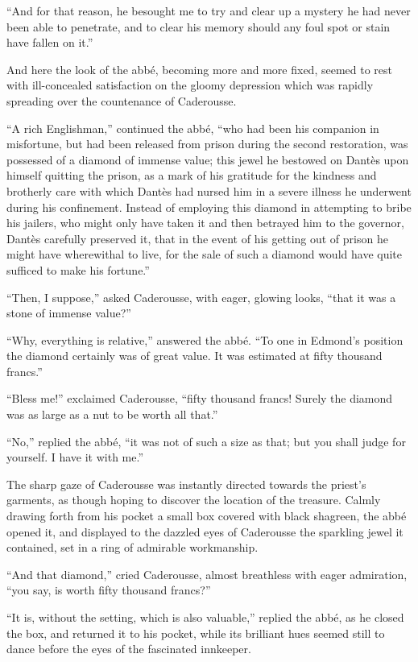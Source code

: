 “And for that reason, he besought me to try and clear up a mystery he
had never been able to penetrate, and to clear his memory should any
foul spot or stain have fallen on it.”

And here the look of the abbé, becoming more and more fixed, seemed to
rest with ill-concealed satisfaction on the gloomy depression which was
rapidly spreading over the countenance of Caderousse.

“A rich Englishman,” continued the abbé, “who had been his companion in
misfortune, but had been released from prison during the second
restoration, was possessed of a diamond of immense value; this jewel he
bestowed on Dantès upon himself quitting the prison, as a mark of his
gratitude for the kindness and brotherly care with which Dantès had
nursed him in a severe illness he underwent during his confinement.
Instead of employing this diamond in attempting to bribe his jailers,
who might only have taken it and then betrayed him to the governor,
Dantès carefully preserved it, that in the event of his getting out of
prison he might have wherewithal to live, for the sale of such a
diamond would have quite sufficed to make his fortune.”

“Then, I suppose,” asked Caderousse, with eager, glowing looks, “that
it was a stone of immense value?”

“Why, everything is relative,” answered the abbé. “To one in Edmond’s
position the diamond certainly was of great value. It was estimated at
fifty thousand francs.”

“Bless me!” exclaimed Caderousse, “fifty thousand francs! Surely the
diamond was as large as a nut to be worth all that.”

“No,” replied the abbé, “it was not of such a size as that; but you
shall judge for yourself. I have it with me.”

The sharp gaze of Caderousse was instantly directed towards the
priest’s garments, as though hoping to discover the location of the
treasure. Calmly drawing forth from his pocket a small box covered with
black shagreen, the abbé opened it, and displayed to the dazzled eyes
of Caderousse the sparkling jewel it contained, set in a ring of
admirable workmanship.

“And that diamond,” cried Caderousse, almost breathless with eager
admiration, “you say, is worth fifty thousand francs?”

“It is, without the setting, which is also valuable,” replied the abbé,
as he closed the box, and returned it to his pocket, while its
brilliant hues seemed still to dance before the eyes of the fascinated
innkeeper.

